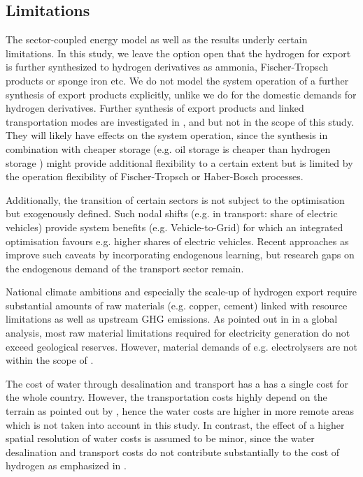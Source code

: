 \subsection*{Limitations}
\label{subsec:limitations}

The sector-coupled energy model as well as the results underly certain limitations. In this study, we leave the option open that the hydrogen for export is further synthesized to hydrogen derivatives as ammonia, Fischer-Tropsch products or sponge iron etc. We do not model the system operation of a further synthesis of export products explicitly, unlike we do for the domestic demands for hydrogen derivatives. Further synthesis of export products and linked transportation modes are investigated in \cite{Hampp2021}, \cite{Galimova2023} and \cite{Verpoort2023} but not in the scope of this study. They will likely have effects on the system operation, since the synthesis in combination with cheaper storage (e.g. oil storage is cheaper than hydrogen storage \cite{DEA2019TechnologyData}) might provide additional flexibility to a certain extent but is limited by the operation flexibility of Fischer-Tropsch or Haber-Bosch processes.

Additionally, the transition of certain sectors is not subject to the optimisation but exogenously defined. Such nodal shifts (e.g. in transport: share of electric vehicles) provide system benefits (e.g. Vehicle-to-Grid) for which an integrated optimisation favours e.g. higher shares of electric vehicles.
Recent approaches as \cite{Zeyen2023} improve such caveats by incorporating endogenous learning, but research gaps on the endogenous demand of the transport sector remain.

National climate ambitions and especially the scale-up of hydrogen export require substantial amounts of raw materials (e.g. copper, cement) linked with resource limitations as well as upstream GHG emissions. As pointed out in \cite{Wang2023} in a global analysis, most raw material limitations required for electricity generation do not exceed geological reserves. However, material demands of e.g. electrolysers are not within the scope of \cite{Wang2023}.

The cost of water through desalination and transport has a 
has a single cost for the whole country. However, the transportation costs highly depend on the terrain as pointed out by \cite{Caldera2016}, hence the water costs are higher in more remote areas which is not taken into account in this study. In contrast, the effect of a higher spatial resolution of water costs is assumed to be minor, since the water desalination and transport costs do not contribute substantially to the cost of hydrogen as emphasized in \cite{Hampp2023}. %

